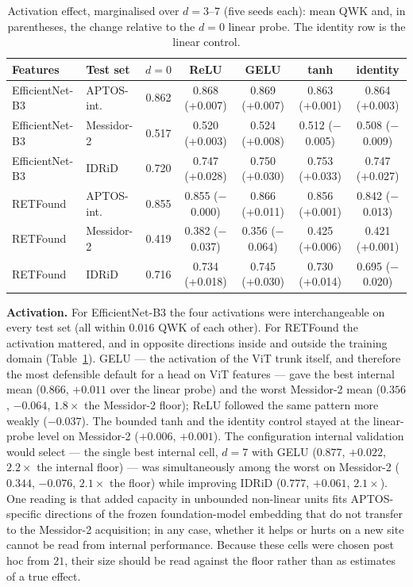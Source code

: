 \documentclass[journal]{IEEEtran}
\renewcommand{\_}{\origunderscore\allowbreak}
\begin{document}
\begin{table}[!t]
\centering\footnotesize
\caption{Activation effect, marginalised over $d=3$--$7$ (five seeds each):
mean QWK and, in parentheses, the change relative to the $d=0$ linear probe. The
identity row is the linear control.}
\label{tab:headact}
\setlength{\tabcolsep}{5pt}
\begin{tabular}{llccccc}
\toprule
Features & Test set & $d=0$ & ReLU & GELU & tanh & identity \\
\midrule
EfficientNet-B3 & APTOS-int. & 0.862 & 0.868 (+0.007) & 0.869 (+0.007) & 0.863 (+0.001) & 0.864 (+0.003) \\
EfficientNet-B3 & Messidor-2 & 0.517 & 0.520 (+0.003) & 0.524 (+0.008) & 0.512 ($-$0.005) & 0.508 ($-$0.009) \\
EfficientNet-B3 & IDRiD & 0.720 & 0.747 (+0.028) & 0.750 (+0.030) & 0.753 (+0.033) & 0.747 (+0.027) \\
\midrule
RETFound & APTOS-int. & 0.855 & 0.855 ($-$0.000) & 0.866 (+0.011) & 0.856 (+0.001) & 0.842 ($-$0.013) \\
RETFound & Messidor-2 & 0.419 & 0.382 ($-$0.037) & 0.356 ($-$0.064) & 0.425 (+0.006) & 0.421 (+0.001) \\
RETFound & IDRiD & 0.716 & 0.734 (+0.018) & 0.745 (+0.030) & 0.730 (+0.014) & 0.695 ($-$0.020) \\
\bottomrule
\end{tabular}
\end{table}

\textbf{Activation.} For EfficientNet-B3 the four activations were
interchangeable on every test set (all within $0.016$ QWK of each other). For
RETFound the activation mattered, and in opposite directions inside and outside
the training domain (Table~\ref{tab:headact}). GELU --- the activation of the ViT
trunk itself, and therefore the most defensible default for a head on ViT
features --- gave the best internal mean ($0.866$, $+0.011$ over the linear probe)
and the worst Messidor-2 mean ($0.356$, $-0.064$, $1.8\times$ the Messidor-2
floor); ReLU followed the same pattern more weakly ($-0.037$). The bounded tanh
and the identity control stayed at the linear-probe level on Messidor-2
($+0.006$, $+0.001$). The configuration internal validation would select ---
the single best internal cell, $d=7$ with GELU ($0.877$, $+0.022$, $2.2\times$
the internal floor) --- was simultaneously among the worst on Messidor-2
($0.344$, $-0.076$, $2.1\times$ the floor) while improving IDRiD ($0.777$,
$+0.061$, $2.1\times$). One reading is that added capacity in unbounded
non-linear units fits APTOS-specific directions of the frozen foundation-model
embedding that do not transfer to the Messidor-2 acquisition; in any case,
whether it helps or hurts on a new site cannot be
read from internal performance. Because these cells were chosen post hoc from
$21$, their size should be read against the floor rather than as estimates of a
true effect.
\end{document}

